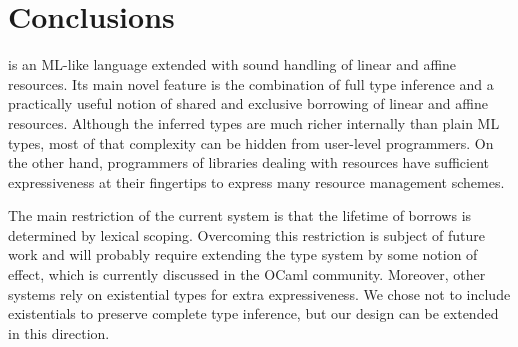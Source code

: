 
\section{Conclusions}
\label{sec:conclusions}

\lang is an ML-like language extended with sound handling of linear and affine resources. Its main novel feature is the combination of full type inference and a practically useful notion of shared and exclusive borrowing of linear and affine resources.
Although the inferred types are much richer internally than plain ML types, most of that complexity can be hidden from user-level programmers. On the other hand, programmers of libraries dealing with resources have sufficient expressiveness at their fingertips to express many resource management schemes.

The main restriction of the current system is that the lifetime of borrows is determined by lexical scoping. Overcoming this restriction is subject of future work and will probably require extending the type system by some notion of effect, which is currently discussed in the OCaml community. 
Moreover, other systems rely on existential types for extra expressiveness. We chose not to include existentials to preserve complete type inference, but our design can be extended in this direction. 

